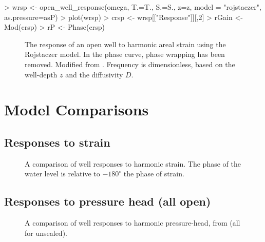 \documentclass[12pt]{article}
\begin{document}
\begin{Schunk}
\begin{Sinput}
> wrsp <- open_well_response(omega, T.=T., S.=S., z=z, model = "rojstaczer", as.pressure=asP)
> plot(wrsp)
> crsp <- wrsp[["Response"]][,2]
> rGain <- Mod(crsp)
> rP <- Phase(crsp)
\end{Sinput}
\end{Schunk}

\begin{figure}[htb!]
\begin{center}
\caption{The response of an open well to harmonic areal strain using
the Rojstaczer model. In the phase curve, phase wrapping has been removed.
Modified from \citet[][Fig.~3]{rojstaczer1988}.
Frequency is dimensionless, based on the well-depth $z$ and the diffusivity
$D$.}
\label{fig:owrsp-roj}
\end{center}
\end{figure}


\clearpage
\section{Model Comparisons}

\subsection{Responses to strain}
\begin{figure}[htb!]
\begin{center}
\caption{A comparison of well responses to harmonic strain. 
The phase of the water level is relative to $-180^\circ$ the phase of strain.}
\label{fig:ewrsp-all}
\end{center}
\end{figure}

\clearpage
\subsection{Responses to pressure head (all open)}
\begin{figure}[htb!]
\begin{center}
\caption{A comparison of well responses to harmonic pressure-head, 
from \citet{cooper1965, hsieh1987, liu1989} (all for unsealed).}
\label{fig:owrsp-all}
\end{center}
\end{figure}



\end{document}
